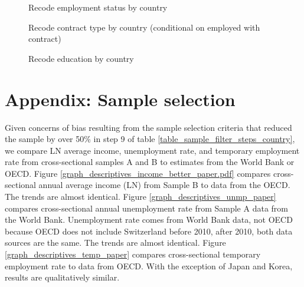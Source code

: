 \begin{sidewaysfigure}[h!]
    \caption{Recode employment status by country}
    \label{graph_descriptives_emp_status}
\end{sidewaysfigure}

\begin{sidewaysfigure}[h!]
    \caption{Recode contract type by country (conditional on employed with contract)}
    \label{graph_descriptives_contyp}
\end{sidewaysfigure}

\begin{sidewaysfigure}[h!]
    \caption{Recode education by country}
    \label{graph_descriptives_education}
\end{sidewaysfigure}


\clearpage
\section{Appendix: Sample selection}\label{appendix:sample_selection}
\setcounter{figure}{0}    
\setcounter{table}{0}    
\renewcommand*\thetable{\Alph{section}.\arabic{table}}
\renewcommand*\thefigure{\Alph{section}.\arabic{figure}}
\renewcommand{\theHfigure}{\Alph{section}.\arabic{table}}
\renewcommand{\theHtable}{\Alph{section}.\arabic{figure}}

Given concerns of bias resulting from the sample selection criteria that reduced the sample by over 50\% in step 9 of table \ref{table_sample_filter_steps_country}, we compare LN average income, unemployment rate, and temporary employment rate from cross-sectional samples A and B to estimates from the World Bank or OECD.  Figure \ref{graph_descriptives_income_better_paper.pdf} compares cross-sectional annual average income (LN) from Sample B to data from the OECD.  The trends are almost identical.  Figure \ref{graph_descriptives_unmp_paper} compares cross-sectional annual unemployment rate from Sample A data from the World Bank.  Unemployment rate comes from World Bank data, not OECD because OECD does not include Switzerland before 2010, after 2010, both data sources are the same.  The trends are almost identical.  Figure  \ref{graph_descriptives_temp_paper} compares cross-sectional temporary employment rate to data from OECD.  With the exception of Japan and Korea, results are qualitatively similar.

